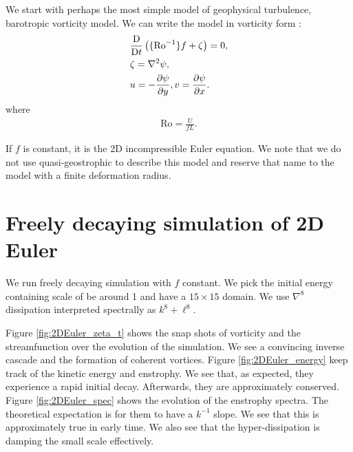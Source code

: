 \graphicspath{{Baro_vort/code/plot_snap/figs/}}

We start with perhaps the most simple model of geophysical turbulence, barotropic vorticity model. We can write the model in vorticity form \parencite[\S 4.2.1]{Vallis_17}:
\begin{align}
    &\frac{\mathrm{D}}{\mathrm{D} t}\left( \{\text{Ro}^{-1}\}f+\zeta \right) = 0,\\
    &\zeta = \nabla^2\psi,\\
    &u = -\frac{\partial\psi}{\partial y}, v = \frac{\partial\psi}{\partial x}.
\end{align}
where
\begin{align}
    \text{Ro} = \frac{U}{fL}.
\end{align}

If $f$ is constant, it is the 2D incompressible Euler equation. We note that we do not use quasi-geostrophic to describe this model and reserve that name to the model with a finite deformation radius.

\section{Freely decaying simulation of 2D Euler}
We run freely decaying simulation with $f$ constant. We pick the initial energy containing scale of be around 1 and have a $15\times 15$ domain. We use $\nabla^8$ dissipation interpreted spectrally as $k^8+\ell^8$. 

Figure \ref{fig:2DEuler_zeta_t} shows the snap shots of vorticity and the streamfunction over the evolution of the simulation. We see a convincing inverse cascade and the formation of coherent vortices. Figure \ref{fig:2DEuler_energy} keep track of the kinetic energy and enstrophy. We see that, as expected, they experience a rapid initial decay. Afterwards, they are approximately conserved. Figure \ref{fig:2DEuler_spec} shows the evolution of the enstrophy spectra. The theoretical expectation is for them to have a $k^{-1}$ slope. We see that this is approximately true in early time. We also see that the hyper-dissipation is damping the small scale effectively.

